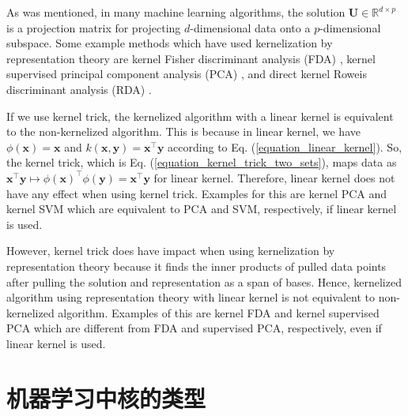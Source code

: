 \documentclass[lang=cn,10pt]{gorgeousnbook}
\numberwithin{equation}{section}%
\numberwithin{figure}{section}%
\begin{document}
As was mentioned, in many machine learning algorithms, the solution $\boldsymbol{U} \in \mathbb{R}^{d \times p}$ is a projection matrix for projecting $d$-dimensional data onto a $p$-dimensional subspace. Some example methods which have used kernelization by representation theory are kernel Fisher discriminant analysis (FDA) \cite{mika1999fisher,ghojogh2019fisher},
kernel supervised principal component analysis (PCA) \cite{barshan2011supervised,ghojogh2019unsupervised}, and direct kernel Roweis discriminant analysis (RDA) \cite{ghojogh2020generalized}. 

\begin{remark}\label{remark_linear_kernel_equivalent_to_non_kernelized}
If we use kernel trick, the kernelized algorithm with a linear kernel is equivalent to the non-kernelized algorithm. This is because in linear kernel, we have $\phi(\boldsymbol{x}) = \boldsymbol{x}$ and $k(\boldsymbol{x}, \boldsymbol{y}) = \boldsymbol{x}^\top \boldsymbol{y}$ according to Eq. (\ref{equation_linear_kernel}). So, the kernel trick, which is Eq. (\ref{equation_kernel_trick_two_sets}), maps data as $\boldsymbol{x}^\top \boldsymbol{y} \mapsto \phi(\boldsymbol{x})^\top \phi(\boldsymbol{y}) = \boldsymbol{x}^\top \boldsymbol{y}$ for linear kernel. Therefore, linear kernel does not have any effect when using kernel trick. Examples for this are kernel PCA \cite{scholkopf1997kernel,scholkopf1998nonlinear,ghojogh2019unsupervised} and kernel SVM \cite{boser1992training,vapnik1995nature} which are equivalent to PCA and SVM, respectively, if linear kernel is used. 

However, kernel trick does have impact when using kernelization by representation theory because it finds the inner products of pulled data points after pulling the solution and representation as a span of bases. Hence, kernelized algorithm using representation theory with linear kernel is not equivalent to non-kernelized algorithm. Examples of this are kernel FDA \cite{mika1999fisher,ghojogh2019fisher} and kernel supervised PCA \cite{barshan2011supervised,ghojogh2019unsupervised} which are different from FDA and supervised PCA, respectively, even if linear kernel is used. 
\end{remark}







\section{机器学习中核的类型} \label{section_kernel_in_machine_learning}
\end{document}
